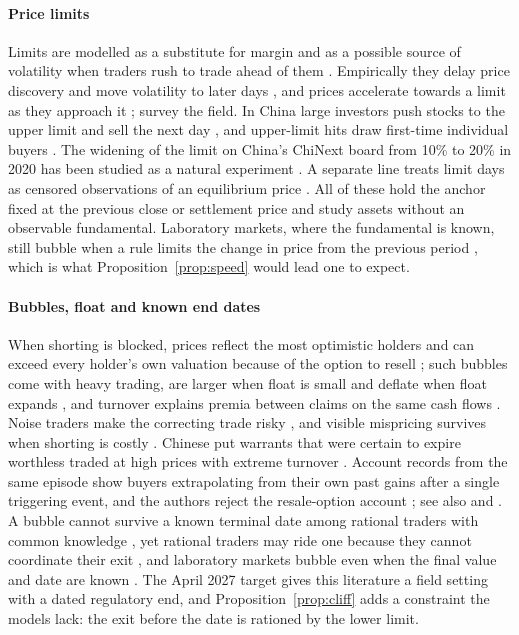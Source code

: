 \documentclass[10pt,journal,a4paper]{IEEEtran}
\theoremstyle{definition}
\begin{document}
\paragraph{Price limits} Limits are modelled as a substitute for margin \citep{brennan1986theory} and as a possible source of volatility when traders rush to trade ahead of them \citep{subrahmanyam1994circuit}. Empirically they delay price discovery and move volatility to later days \citep{kim1997price}, and prices accelerate towards a limit as they approach it \citep{cho2003magnet}; \citet{sifat2019circuit,sifat2020survey} survey the field. In China large investors push stocks to the upper limit and sell the next day \citep{chen2019daily}, and upper-limit hits draw first-time individual buyers \citep{seasholes2007predictable}. The widening of the limit on China's ChiNext board from 10\% to 20\% in 2020 has been studied as a natural experiment \citep{wan2022effect,zhang2023price,tang2023price}. A separate line treats limit days as censored observations of an equilibrium price \citep{kodres1993tests,morgan1999limit,wei2002censored}. All of these hold the anchor fixed at the previous close or settlement price and study assets without an observable fundamental. Laboratory markets, where the fundamental is known, still bubble when a rule limits the change in price from the previous period \citep{king1993robustness}, which is what Proposition~\ref{prop:speed} would lead one to expect.

\paragraph{Bubbles, float and known end dates} When shorting is blocked, prices reflect the most optimistic holders \citep{miller1977risk} and can exceed every holder's own valuation because of the option to resell \citep{harrison1978speculative,scheinkman2003overconfidence}; such bubbles come with heavy trading, are larger when float is small and deflate when float expands \citep{hong2006asset}, and turnover explains premia between claims on the same cash flows \citep{mei2009speculative}. Noise traders make the correcting trade risky \citep{delong1990noise}, and visible mispricing survives when shorting is costly \citep{lamont2003can}. Chinese put warrants that were certain to expire worthless traded at high prices with extreme turnover \citep{xiong2011chinese}. Account records from the same episode show buyers extrapolating from their own past gains after a single triggering event, and the authors reject the resale-option account \citep{pearson2021chinese}; see also \citet{li2021winners} and \citet{barberis2018extrapolation}. A bubble cannot survive a known terminal date among rational traders with common knowledge \citep{tirole1982possibility}, yet rational traders may ride one because they cannot coordinate their exit \citep{abreu2003bubbles}, and laboratory markets bubble even when the final value and date are known \citep{smith1988bubbles}. The April 2027 target gives this literature a field setting with a dated regulatory end, and Proposition~\ref{prop:cliff} adds a constraint the models lack: the exit before the date is rationed by the lower limit.
\end{document}
